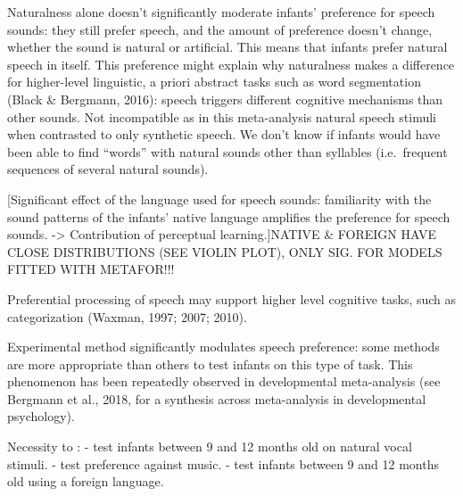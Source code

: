 \documentclass[man]{apa6}
\begin{document}
Naturalness alone doesn't significantly moderate infants' preference for
speech sounds: they still prefer speech, and the amount of preference
doesn't change, whether the sound is natural or artificial. This means
that infants prefer natural speech in itself. This preference might
explain why naturalness makes a difference for higher-level linguistic,
a priori abstract tasks such as word segmentation (Black \& Bergmann,
2016): speech triggers different cognitive mechanisms than other sounds.
Not incompatible as in this meta-analysis natural speech stimuli when
contrasted to only synthetic speech. We don't know if infants would have
been able to find \enquote{words} with natural sounds other than
syllables (i.e.~frequent sequences of several natural sounds).

{[}Significant effect of the language used for speech sounds:
familiarity with the sound patterns of the infants' native language
amplifies the preference for speech sounds. -\textgreater{} Contribution
of perceptual learning.{]}NATIVE \& FOREIGN HAVE CLOSE DISTRIBUTIONS
(SEE VIOLIN PLOT), ONLY SIG. FOR MODELS FITTED WITH METAFOR!!!

Preferential processing of speech may support higher level cognitive
tasks, such as categorization (Waxman, 1997; 2007; 2010).

Experimental method significantly modulates speech preference: some
methods are more appropriate than others to test infants on this type of
task. This phenomenon has been repeatedly observed in developmental
meta-analysis (see Bergmann et al., 2018, for a synthesis across
meta-analysis in developmental psychology).

Necessity to : - test infants between 9 and 12 months old on natural
vocal stimuli. - test preference against music. - test infants between 9
and 12 months old using a foreign language.

\newpage

\begingroup
\setlength{\parindent}{-0.5in} \setlength{\leftskip}{0.5in}

\hypertarget{refs}{}

\endgroup
\end{document}
